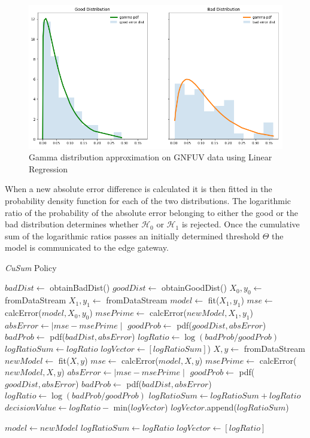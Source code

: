\documentclass{mpaper}
\begin{document}
\begin{figure}[h]
    \centering
    \includegraphics[scale=0.3]{imgs/goodVSbad.png}
    \caption{Gamma distribution approximation on GNFUV data using Linear Regression}
    \label{fig:goodvsbad}
\end{figure}

When a new absolute error difference is calculated it is then fitted in the probability density function for each of the two distributions. The logarithmic ratio of the probability of the absolute error belonging to either the good or the bad distribution determines whether $\mathcal{H}_0$ or $\mathcal{H}_1$ is rejected. Once the cumulative sum of the logarithmic ratios passes an initially determined threshold $\Theta$ the model is communicated to the edge gateway.

\begin{algorithm}[!h]
\caption{\textit{CuSum} Policy}\label{polCusum}
\begin{algorithmic}
\State $badDist \gets$ obtainBadDist() 
\State $goodDist \gets$ obtainGoodDist() 
\State $X_0, y_0 \gets$ fromDataStream
\State $X_1, y_1 \gets$ fromDataStream
\State $model \gets$ fit($X_1, y_1$)
\State $mse \gets$ calcError($model,X_0,y_0$)
\State $msePrime \gets$ calcError($newModel,X_1,y_1$)
\State $absError \gets \mid mse - msePrime \mid$
\State $goodProb \gets$ pdf($goodDist,absError$)
\State $badProb \gets$ pdf($badDist,absError$)
\State $logRatio \gets \log(badProb/goodProb)$
\State $logRatioSum \gets logRatio$
\State $logVector \gets [logRatioSum]$)
    \State $X, y \gets$ fromDataStream
    \State $newModel \gets$ fit($X,y$)
    \State $mse \gets$ calcError($model,X,y$)
    \State $msePrime \gets$ calcError($newModel,X,y$)
    \State $absError \gets \mid mse - msePrime \mid$
    \State $goodProb \gets$ pdf($goodDist, absError$)
    \State $badProb \gets$ pdf($badDist, absError$)
    \State $logRatio \gets \log(badProb/goodProb)$
    \State $logRatioSum \gets logRatioSum + logRatio$
    \State $decisionValue \gets logRatio - $ min($logVector$)
    \State $logVector$.append($logRatioSum$)

        \State $model \gets newModel$ 
        \State $logRatioSum \gets logRatio$
        \State $logVector \gets [logRatio]$
    \EndIf
\EndWhile
\end{algorithmic}
\end{algorithm}
\newpage
\end{document}
